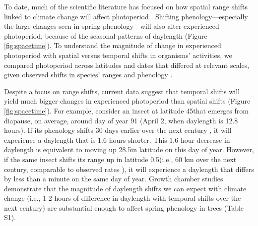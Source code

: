 \documentclass{article}
\begin{document}
\par To date, much of the scientific literature has focused on how spatial range shifts linked to climate change will affect photoperiod \citep[e.g.,] []{saikkonen2012,way2015}. Shifting phenology---especially the large changes seen in spring phenology---will also alter experienced photoperiod, because of the seasonal patterns of daylength (Figure \ref{fig:spacetime}). %
To understand the magnitude of change in experienced photoperiod with spatial versus temporal shifts in organisms' activities, we compared photoperiod across latitudes and dates that differed at relevant scales, given observed shifts in species' ranges and phenology \citep{parmesan2003,chen2011}. %
\par Despite a focus on range shifts, current data suggest that temporal shifts will yield much bigger changes in experienced photoperiod than spatial shifts (Figure \ref{fig:spacetime}). %
For example, consider an insect at latitude 45\degree that emerges from diapause, on average, around day of year 91 (April 2, when daylength is 12.8 hours). If its phenology shifts 30 days earlier over the next century \citep[][i.e., a rate of ~3 days per decade, as has been observed]{parmesan2003}, it will experience a daylength that is 1.6 hours shorter. This 1.6 hour decrease in daylength is equivalent to moving up 28.5\degree  in latitude on this day of year. However, if the same insect shifts its range up in latitude 0.5\degree  (i.e., 60 km over the next century,  comparable to observed rates \citep{parmesan2003,chen2011}), it will experience a daylength that differs by less than a minute on the same day of year. Growth chamber studies demonstrate that the magnitude of daylength shifts we can expect with climate change (i.e., 1-2 hours of difference in daylength with temporal shifts over the next century) are substantial enough to affect spring phenology in trees (Table S1). %
\end{document}
